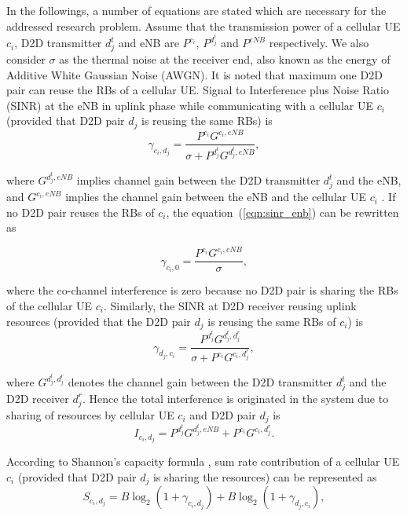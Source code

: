 \documentclass{ieeeaccess}
\begin{document}
\smallskip

In the followings, a number of equations are stated which are necessary for the addressed research problem. Assume that the transmission power of a cellular UE $c_i$, D2D transmitter $d_j^t$ and eNB are $P^{c_i}$, $P^{d_j^t}$ and $P^{eNB}$ respectively. We also consider $\sigma$ as the thermal noise at the receiver end, also known as the energy of Additive White Gaussian Noise (AWGN). It is noted that maximum one D2D pair can reuse the RBs of a cellular UE. Signal to Interference plus Noise Ratio (SINR) at the eNB in uplink phase while communicating with a cellular UE $c_i$ (provided that D2D pair $d_j$ is reusing the same RBs) is 
\begin{equation}\label{eqn:sinr_enb}
\gamma_{c_i,d_j} = \frac{P^{c_i}G^{c_i,eNB}}{\sigma + P^{d_{j}^{t}}G^{d_{j}^{t},eNB}},
\end{equation}

where $G^{d_{j}^{t},eNB}$ implies channel gain between the D2D transmitter $d_{j}^t$ and the eNB, and $G^{c_i,eNB}$ implies the channel gain between the eNB and the cellular UE $c_i$ \cite{islam2015reducing}. If no D2D pair reuses the RBs of $c_i$, the equation~(\ref{eqn:sinr_enb}) can be rewritten as  

\begin{equation}\label{eqn:sinr_enb0}
\gamma_{c_i,0} = \frac{P^{c_i}G^{c_i,eNB}}{\sigma},
\end{equation}

 
where the co-channel interference is zero because no D2D pair is sharing the RBs of the cellular UE $c_i$. Similarly, the SINR at D2D receiver reusing uplink resources (provided that the D2D pair $d_j$ is reusing the same RBs of $c_i$) is
\begin{equation}\label{eqn:sinr_d}
\gamma_{d_j,c_i} = \frac{P^{d_{j}^t}G^{d_{j}^t,d_{j}^r}}{\sigma + P^{c_i}G^{c_i,d_{j}^r}},
\end{equation}

where $G^{d_{j}^t,d_{j}^r}$ denotes the channel gain between the D2D transmitter $d_{j}^t$ and the D2D receiver $d_{j}^r$.
Hence the total interference is originated in the system due to sharing of resources by cellular UE $c_i$ and D2D pair $d_j$ is
\begin{equation}\label{eqn:interference}
I_{c_i,d_j} = P^{d_j^t}G^{d_{j}^t,eNB} + P^{c_i}G^{c_i,d_{j}^r}.
\end{equation}


According to Shannon's capacity formula \cite{forouzan}, sum rate contribution of a cellular UE $c_i$ (provided that D2D pair $d_j$ is sharing the resources) can be represented as 
\begin{equation}\label{eqn:sumrate}
S_{c_i,d_j} = B\log_{2}(1+\gamma_{c_i,d_j}) + B\log_{2}(1+\gamma_{d_j,c_i}),
\end{equation}
\end{document}
